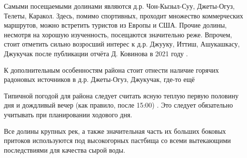 Самыми посещаемыми долинами являются д.р. Чон-Кызыл-Суу, Джеты-Огуз, Телеты, Каракол. Здесь, помимо спортивных, проходит множество коммерческих маршрутов, можно встретить туристов из Европы и США. Прочие долины, несмотря на хорошую изученность, посещаются значительно реже. Впрочем, стоит отметить сильно возросший интерес к д.р. Джууку, Иттиш, Ашукашкасу, Джукучак после публикации отчёта Д. Ковинова в 2021 году \cite{kovinov2021}.

К дополнительным особенностям района стоит отнести наличие горячих радоновых источников в д.р. Джеты-Огуз, Джукучак, \alert{где-то ещё}

Типичной погодой для района следует считать ясную теплую первую половину дня и дождливый вечер (как правило, после 15:00) \cite{rodina2012, tipsina2024, sergeev2024, smurov2024}. Это следует обязательно учитывать при планировании ходового дня.

Все долины крупных рек, а также значительная часть их больших боковых притоков используются под высокогорных пастбища со всеми вытекающими последствиями для качества сырой воды.

\clearpage